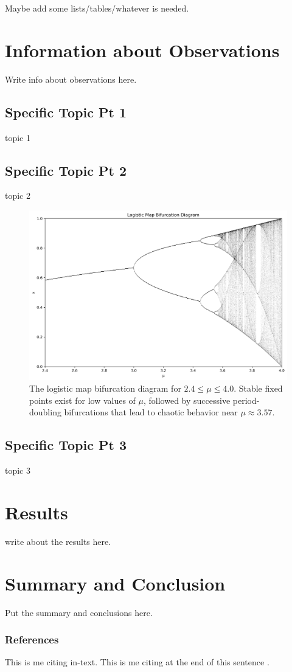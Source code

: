\documentclass{aastex631}
\begin{document}
Maybe add some lists/tables/whatever is needed.



\section{Information about Observations}
Write info about observations here.

\subsection{Specific Topic Pt 1} \label{sec:subtopic1}
topic 1

\subsection{Specific Topic Pt 2} \label{sec:subtopic2}
topic 2

\begin{figure}[H]
    \centering
    \includegraphics[width=0.65\linewidth]{bifurcation.png}
    \caption{The logistic map bifurcation diagram for $2.4\leq \mu \leq 4.0$. Stable fixed points exist for low values of $\mu$, followed by successive period-doubling bifurcations that lead to chaotic behavior near $\mu\approx 3.57$.}
    \label{fig:bifurcation}
\end{figure}


\subsection{Specific Topic Pt 3} \label{sec:subtopic3}
topic 3

\section{Results} \label{sec:results}
write about the results here.


\section{Summary and Conclusion} \label{sec:summary}
Put the summary and conclusions here.


\subsubsection{References}
This is me citing \citet{boeing} in-text. This is me citing at the end of this sentence \citep{bubolo}.

\newpage

%

\end{document}
